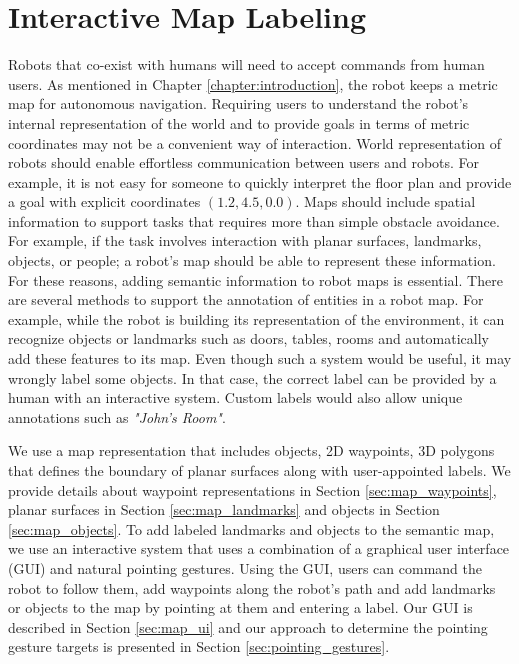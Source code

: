 \chapter{Interactive Map Labeling}
\label{chapter:map_annotation}

Robots that co-exist with humans will need to accept commands from human users. As mentioned in Chapter \ref{chapter:introduction}, the robot keeps a metric map for autonomous navigation. Requiring users to understand the robot's internal representation of the world and to provide goals in terms of metric coordinates may not be a convenient way of interaction. World representation of robots should enable effortless communication between users and robots. For example, it is not easy for someone to quickly interpret the floor plan and provide a goal with explicit coordinates $(1.2,4.5,0.0)$. Maps should include spatial information to support tasks that requires more than simple obstacle avoidance. For example, if the task involves interaction with planar surfaces, landmarks, objects, or people; a robot's map should be able to represent these information. For these reasons, adding semantic information to robot maps is essential. There are several methods to support the annotation of entities in a robot map. For example, while the robot is building its representation of the environment, it can recognize objects or landmarks such as doors, tables, rooms and automatically add these features to its map. Even though such a system would be useful, it may wrongly label some objects. In that case, the correct label can be provided by a human with an interactive system. Custom labels would also allow unique annotations such as \textit{"John's Room"}.

We use a map representation that includes objects, 2D waypoints, 3D polygons that defines the boundary of planar surfaces along with user-appointed labels. We provide details about waypoint representations in Section \ref{sec:map_waypoints}, planar surfaces in Section \ref{sec:map_landmarks} and objects in Section \ref{sec:map_objects}. To add labeled landmarks and objects to the semantic map, we use an interactive system that uses a combination of a graphical user interface (GUI) and natural pointing gestures. Using the GUI, users can command the robot to follow them, add waypoints along the robot's path and add landmarks or objects to the map by pointing at them and entering a label. Our GUI is described in Section \ref{sec:map_ui} and our approach to determine the pointing gesture targets is presented in Section \ref{sec:pointing_gestures}.

